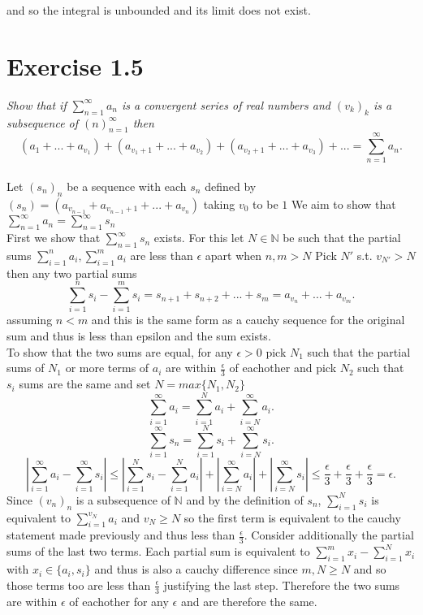 \documentclass{amsart}
\begin{document}
    and so the integral is unbounded and its limit does not exist.

    \section{Exercise 1.5}
    \emph{Show that if $\sum_{n=1}^{\infty}a_n$ is a convergent series of real numbers and $(v_k)_k$ 
        is a subsequence of $(n)_{n=1}^{\infty}$ then
        \[
            (a_1+...+a_{v_1}) + (a_{v_1+1} + ... + a_{v_2}) + (a_{v_2+1} + ... + a_{v_3}) + ... = \sum_{n=1}^{\infty}a_n
        .\] 
    }\\
    Let $(s_n)_n$ be a sequence with each $s_n$ defined by $(s_n) = (a_{v_{n-1}} + a_{v_{n-1}+1} + ... + a_{v_n})$ taking  $v_0$ to be $1$ 
    We aim to show that $ \sum_{n=1}^{\infty}a_n = \sum_{n=1}^{\infty}s_n$\\
    First we show that $\sum_{n=1}^{\infty}s_n$ exists. For this let $N \in \mathbb{N}$ be such that the partial sums $\sum_{i=1}^{n}a_i, \sum_{i=1}^{m}a_i$ are less than $\epsilon$
    apart when $n,m > N$
    Pick $N'$ s.t.  $v_{N'} > N$ then any two partial sums 
    \[
        \sum_{i=1}^{n}s_i - \sum_{i=1}^{m}s_i = s_{n+1} + s_{n+2} + ... + s_m = a_{v_n} + ... + a_{v_m}
    .\] 
    assuming $n < m$ and this is the same form as a cauchy sequence for the original sum and thus is less than epsilon and the sum exists.
    \\
    To show that the two sums are equal, for any $\epsilon > 0$ pick $N_1$ such that the partial sums of $N_1$ or more terms  of $a_i$ are within $\frac{\epsilon}{3}$ of eachother and pick $N_2$ such that $s_i$ sums are the same and set $N = max\{N_1,N_2\}$
    \[
        \sum_{i=1}^{\infty}a_i = \sum_{i=1}^{N}a_i + \sum_{i=N}^{\infty}a_i
    .\] 
    \[
        \sum_{i=1}^{\infty}s_n = \sum_{i=1}^{N}s_i + \sum_{i=N}^{\infty}s_i
    .\] 
    \[
    |\sum_{i=1}^{\infty}a_i - \sum_{i=1}^{\infty}s_i| \le |\sum_{i=1}^{N}s_i - \sum_{i=1}^{N}a_i| + |\sum_{i=N}^{\infty}a_i| + |\sum_{i=N}^{\infty}s_i| \le \frac{\epsilon}{3} + \frac{\epsilon}{3} + \frac{\epsilon}{3} = \epsilon
    .\] 
    Since $(v_n)_n$ is a subsequence of  $ \mathbb{N}$ and by the definition of $s_n$, $\sum_{i=1}^{N}s_i$ is equivalent to $\sum_{i=1}^{v_{N}}a_i$ and $v_{N} \ge N$ so the first term is
    equivalent to the cauchy statement made previously and thus less than $\frac{\epsilon}{3}$.
    Consider additionally the partial sums of the last two terms. Each partial sum is equivalent to  $\sum_{i=1}^{m}x_i - \sum_{i=1}^{N}x_i$ with $x_i \in \{a_i, s_i\}$ and thus is also a cauchy difference since  $m,N \ge N$ and so those terms
    too are less than $\frac{\epsilon}{3}$ justifying the last step. Therefore the two sums are within $\epsilon$ of eachother for any $\epsilon$ and are therefore the same.
\end{document}
